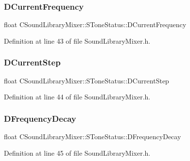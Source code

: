 \subsubsection{\texorpdfstring{D\+Current\+Frequency}{DCurrentFrequency}}
{\footnotesize\ttfamily float C\+Sound\+Library\+Mixer\+::\+S\+Tone\+Status\+::\+D\+Current\+Frequency}



Definition at line 43 of file Sound\+Library\+Mixer.\+h.

\hypertarget{structCSoundLibraryMixer_1_1SToneStatus_a4ad3b9cbb161945d34d2aa6f2bcf7ef4}{}\label{structCSoundLibraryMixer_1_1SToneStatus_a4ad3b9cbb161945d34d2aa6f2bcf7ef4} 
\subsubsection{\texorpdfstring{D\+Current\+Step}{DCurrentStep}}
{\footnotesize\ttfamily float C\+Sound\+Library\+Mixer\+::\+S\+Tone\+Status\+::\+D\+Current\+Step}



Definition at line 44 of file Sound\+Library\+Mixer.\+h.

\hypertarget{structCSoundLibraryMixer_1_1SToneStatus_af7965b72940ecf75158c86bd08743223}{}\label{structCSoundLibraryMixer_1_1SToneStatus_af7965b72940ecf75158c86bd08743223} 
\subsubsection{\texorpdfstring{D\+Frequency\+Decay}{DFrequencyDecay}}
{\footnotesize\ttfamily float C\+Sound\+Library\+Mixer\+::\+S\+Tone\+Status\+::\+D\+Frequency\+Decay}



Definition at line 45 of file Sound\+Library\+Mixer.\+h.

\hypertarget{structCSoundLibraryMixer_1_1SToneStatus_a4573954af1301756c08e09951bb5446d}{}\label{structCSoundLibraryMixer_1_1SToneStatus_a4573954af1301756c08e09951bb5446d} 
